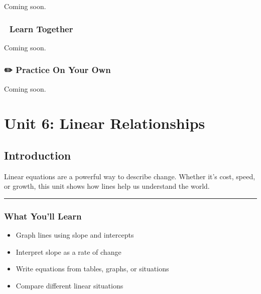 \documentclass[
  letterpaper,
  DIV=11,
  numbers=noendperiod]{scrreprt}
\providecommand{\tightlist}{%
  \setlength{\itemsep}{0pt}\setlength{\parskip}{0pt}}
\begin{document}

Coming soon.

\section*{🧠 Learn Together}\label{learn-together-28}


Coming soon.

\section*{✏️ Practice On Your Own}\label{practice-on-your-own-28}


Coming soon.

\part{Unit 6: Linear Relationships}

\chapter*{Introduction}\label{introduction-5}


Linear equations are a powerful way to describe change. Whether it's
cost, speed, or growth, this unit shows how lines help us understand the
world.

\begin{center}\rule{0.5\linewidth}{0.5pt}\end{center}

\section*{What You'll Learn}\label{what-youll-learn-5}


\begin{itemize}
\tightlist
\item
  Graph lines using slope and intercepts
\item
  Interpret slope as a rate of change
\item
  Write equations from tables, graphs, or situations
\item
  Compare different linear situations
\end{itemize}
\end{document}

